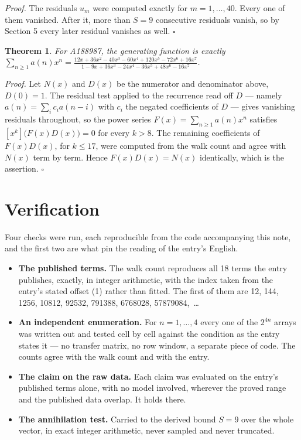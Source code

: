 \documentclass[11pt]{article}
\newtheorem{theorem}{Theorem}
\theoremstyle{definition}
\begin{document}
{\itshape Proof.} The residuals $u_m$ were computed exactly for $m = 1,\dots,40$. Every one of them vanished. After it, more than $S = 9$ consecutive residuals vanish, so by Section 5 every later residual vanishes as well. $\square$

\begin{theorem} For A188987, the generating function is exactly $\sum_{n\ge 1} a(n)x^n = \frac{12x + 36x^{2} - 40x^{3} - 60x^{4} + 120x^{5} - 72x^{6} + 16x^{7}}{1 - 9x + 36x^{3} - 24x^{4} - 36x^{5} + 48x^{6} - 16x^{7}}$.\end{theorem}

{\itshape Proof.} Let $N(x)$ and $D(x)$ be the numerator and denominator above, $D(0)=1$. The residual test applied to the recurrence read off $D$ --- namely $a(n) = \sum_i c_i a(n-i)$ with $c_i$ the negated coefficients of $D$ --- gives vanishing residuals throughout, so the power series $F(x)=\sum_{n\ge 1}a(n)x^n$ satisfies $[x^k]\bigl(F(x)D(x)\bigr) = 0$ for every $k > 8$. The remaining coefficients of $F(x)D(x)$, for $k \le 17$, were computed from the walk count and agree with $N(x)$ term by term. Hence $F(x)D(x) = N(x)$ identically, which is the assertion. $\square$

\section{Verification}

Four checks were run, each reproducible from the code accompanying this note, and the first two are what pin the reading of the entry's English.

\begin{itemize}

\item {\bfseries The published terms.} The walk count reproduces all 18 terms the entry publishes, exactly, in integer arithmetic, with the index taken from the entry's stated offset (1) rather than fitted. The first of them are 12, 144, 1256, 10812, 92532, 791388, 6768028, 57879084,~\dots

\item {\bfseries An independent enumeration.} For $n = 1,\dots,4$ every one of the $2^{4n}$ arrays was written out and tested cell by cell against the condition as the entry states it --- no transfer matrix, no row window, a separate piece of code. The counts agree with the walk count and with the entry.

\item {\bfseries The claim on the raw data.} Each claim was evaluated on the entry's published terms alone, with no model involved, wherever the proved range and the published data overlap. It holds there.

\item {\bfseries The annihilation test.} Carried to the derived bound $S = 9$ over the whole vector, in exact integer arithmetic, never sampled and never truncated.

\end{itemize}
\end{document}
